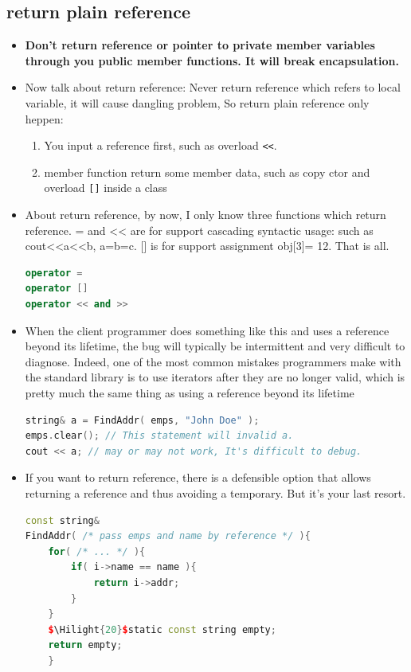 \documentclass[a4paper,12pt,twoside]{book}
\newcommand{\Hilight}[1]{\makebox[0pt][l]{\color{yellow}\rule[-3pt]{#1em}{11pt}}}
\begin{document}
\subsection{return plain reference} 
\begin{itemize}
	\item \textbf{Don't return reference or pointer to private member variables through you public member functions. It will break encapsulation. }
	
	\item Now talk about return reference: Never return reference which refers to local variable, it will cause dangling problem, So return plain reference only heppen:
	\begin{enumerate}
		\item You input a reference first, such as overload \verb=<<=.
		\item member function return some member data, such as copy ctor and overload \verb=[]= inside a class
	\end{enumerate}
	
	\item About return reference, by now, I only know three functions which return reference. = and << are for support cascading syntactic usage: such as cout<<a<<b, a=b=c.  [] is for support assignment obj[3]= 12.  That is all.
\begin{lstlisting}[frame=single, language=c++]
operator =
operator []
operator << and >>
\end{lstlisting}
	
	\item  When the client programmer does something like this and uses a reference beyond its lifetime, the bug will typically be intermittent and very difficult to diagnose. Indeed, one of the most common mistakes programmers make with the standard library is to use iterators after they are no longer valid, which is pretty much the same thing as using a reference beyond its lifetime
	
\begin{lstlisting}[frame=single, language=c++, mathescape=true]
string& a = FindAddr( emps, "John Doe" );
emps.clear(); // This statement will invalid a.
cout << a; // may or may not work, It's difficult to debug.
\end{lstlisting}
	
	\item If you want to return reference,  there is a defensible option that allows returning a reference and thus avoiding a temporary. But it's your last resort.
\begin{lstlisting}[frame=single, language=c++, mathescape=true]
const string&
FindAddr( /* pass emps and name by reference */ ){
	for( /* ... */ ){
		if( i->name == name ){
			return i->addr;
		}
	}
	$\Hilight{20}$static const string empty;
	return empty;
	}
\end{lstlisting}
	

\end{itemize}
\end{document}
